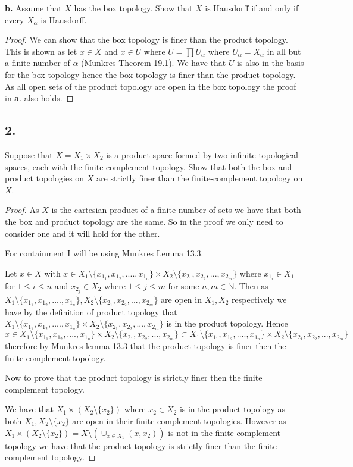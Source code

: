 \documentclass{amsart}
\theoremstyle{plain}
\theoremstyle{definition}
\theoremstyle{remark}
\begin{document}
\vspace{.1in}
{\bfseries b.} Assume that $X$ has the box topology. Show that $X$ is Hausdorff if and only if every $X_{\alpha}$ is Hausdorff. 


\begin{proof}
    We can show that the box topology is finer than the product topology. This is shown as let $x\in X$ and $x\in U$ where $U=\prod U_\alpha$ where $U_\alpha=X_\alpha$ in all but a finite number of $\alpha$ (Munkres Theorem 19.1). We have that $U$ is also in the basis for the box topology hence the box topology is finer than the product topology. As all open sets of the product topology are open in the box topology the proof in {\bfseries a}. also holds.
\end{proof}


\vspace{.15in}
\noindent
\subsection*{2.} Suppose that $X = X_1 \times X_2$ is a product space formed by two infinite topological spaces, each with the finite-complement topology. Show that both the box and product topologies on $X$ are strictly finer than the finite-complement topology on $X$. 

\begin{proof}
    

As $X$ is the cartesian product of a finite number of sets we have that both the box and product topology are the same. So in the proof we only need to consider one and it will hold for the other. 

For containment I will be using Munkres Lemma 13.3. 

Let $x\in X$ with $x\in X_1\setminus \{x_{1_1},x_{1_2},....,x_{1_n}\}\times X_2\setminus \{x_{2_1},x_{2_2},...,x_{2_m}\}$ where $x_{1_{i}}\in X_1$ for $1 \leq i\leq n$ and $x_{2_j}\in X_2$ where $1\leq j \leq m$ for some $n,m\in \mathbb{N}$. Then as $X_1\setminus \{x_{1_1},x_{1_2},....,x_{1_n}\}, X_2\setminus \{x_{2_1},x_{2_2},...,x_{2_m}\}$ are open in $X_1,X_2$ respectively we have by the definition of product topology that $X_1\setminus \{x_{1_1},x_{1_2},....,x_{1_n}\}\times X_2\setminus \{x_{2_1},x_{2_2},...,x_{2_m}\}$ is in the product topology. Hence $x\in X_1\setminus \{x_{1_1},x_{1_2},....,x_{1_n}\}\times X_2\setminus \{x_{2_1},x_{2_2},...,x_{2_m}\}\subset X_1\setminus \{x_{1_1},x_{1_2},....,x_{1_n}\}\times X_2\setminus \{x_{2_1},x_{2_2},...,x_{2_m}\}$ therefore by Munkres lemma 13.3 that the product topology is finer then the finite complement topology.

Now to prove that the product topology is strictly finer then the finite complement topology.

We have that $X_1\times (X_2\setminus \{x_2\})$ where $x_2\in X_2$ is in the product topology as both $X_1,X_2\setminus \{x_2\}$ are open in their finite complement topologies. However as $X_1\times (X_2\setminus \{x_2\})=X\setminus (\cup_{x\in X_1} (x,x_2))$ is not in the finite complement topology we have that the product topology is strictly finer than the finite complement topology.
\end{proof}
\end{document}

